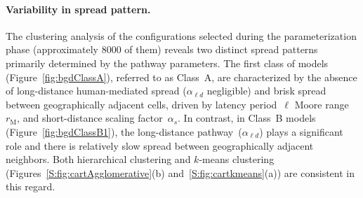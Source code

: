 \documentclass[11pt]{article}
\newcommand{\asd}{\alpha_s}
\newcommand{\ald}{\alpha_{\ell d}}
\newcommand{\mooreRange}{r_\mathrm{M}}
\theoremstyle{definition}
\begin{document}
\paragraph{Variability in spread pattern.} The clustering analysis of the
configurations selected during the parameterization phase (approximately
8000 of them) reveals two distinct spread patterns primarily determined by
the pathway parameters.  The first class of models
(Figure~\ref{fig:bgdClassA}), referred to as Class~A, are characterized by
the absence of long-distance human-mediated spread ($\ald$ negligible) and
brisk spread between geographically adjacent cells, driven by latency
period~$\ell$ Moore range~$\mooreRange$, and short-distance scaling
factor~$\asd$. In contrast, in Class~B models
(Figure~\ref{fig:bgdClassB1}), the long-distance pathway~($\ald$) plays a
significant role  and there is relatively slow spread between
geographically adjacent neighbors. Both hierarchical clustering and
$k$-means clustering (Figures~\ref{S:fig:cartAgglomerative}(b)
and~\ref{S:fig:cartkmeans}(a)) are consistent in this regard.
\end{document}
